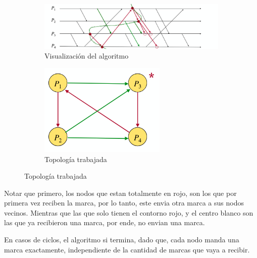 \begin{figure}[H]
  \centering
  \captionsetup[subfigure]{labelformat=empty}
  \begin{subfigure}[b]{0.48\textwidth}
    \includegraphics[width=\textwidth]{img/Chandy_ver.png}
    \caption{Visualización del algoritmo}
  \end{subfigure}
  \hspace{2mm} %
  \begin{subfigure}[b]{0.2\textwidth}
    \includegraphics[width=\textwidth]{img/Topologia.png}
    \caption{Topología trabajada}
  \end{subfigure}
  \label{fig:imagenes_lado_a_lado}
\end{figure}

Notar que primero, los nodos que estan totalmente en rojo, son los que por primera vez reciben la marca, por lo tanto, este envia otra marca a sus nodos vecinos. Mientras que las que solo tienen el contorno rojo, y el centro blanco son las que ya recibieron una marca, por ende, no envian una marca.

En casos de ciclos, el algoritmo si termina, dado que, cada nodo manda una marca exactamente, independiente de la cantidad de marcas que vaya a recibir. 

